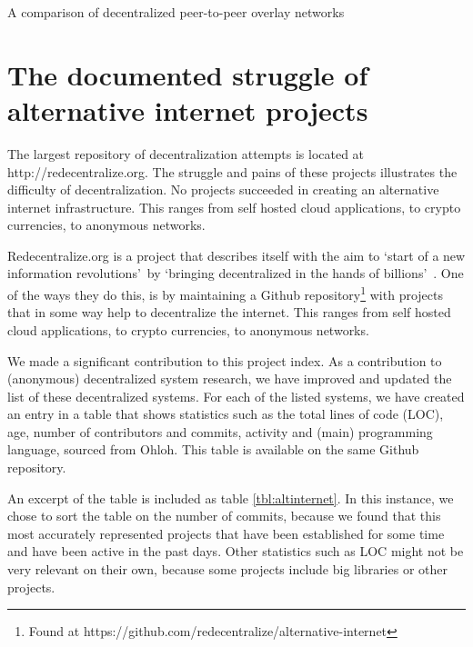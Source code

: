 \documentclass{article}
\begin{document}
	\begin{landscape}

	\begin{table}[p]
		\centering
		
		\caption{A comparison of decentralized peer-to-peer overlay networks}
		\label{tbl:comparison}
	\end{table}
	
	\end{landscape}
	

\section{The documented struggle of alternative internet projects}
	\label{sec:comparison}	
	
	The largest repository of decentralization attempts is located at http://redecentralize.org. The struggle and pains of these projects illustrates the difficulty of decentralization. No projects succeeded in creating an alternative internet infrastructure. This ranges from self hosted cloud applications, to crypto currencies, to anonymous networks.


	Redecentralize.org is a project that describes itself with the aim to \textquoteleft start of a new information revolutions\textquoteright~by \textquoteleft bringing decentralized in the hands of billions\textquoteright~\cite{aboutredecentralizeorg}. One of the ways they do this, is by maintaining a Github repository\footnote{Found at https://github.com/redecentralize/alternative-internet} with projects that in some way help to decentralize the internet. This ranges from self hosted cloud applications, to crypto currencies, to anonymous networks.
		
	We made a significant contribution to this project index.
	As a contribution to (anonymous) decentralized system research, we have improved and updated the list of these decentralized systems. For each of the listed systems, we have created an entry in a table that shows statistics such as the total lines of code (LOC), age, number of contributors and commits, activity and (main) programming language, sourced from Ohloh. This table is available on the same Github repository.
		
		An excerpt of the table is included as table \ref{tbl:altinternet}. In this instance, we chose to sort the table on the number of commits, because we found that this most accurately represented projects that have been established for some time and have been active in the past days. Other statistics such as LOC might not be very relevant on their own, because some projects include big libraries or other projects.
		
\end{document}
